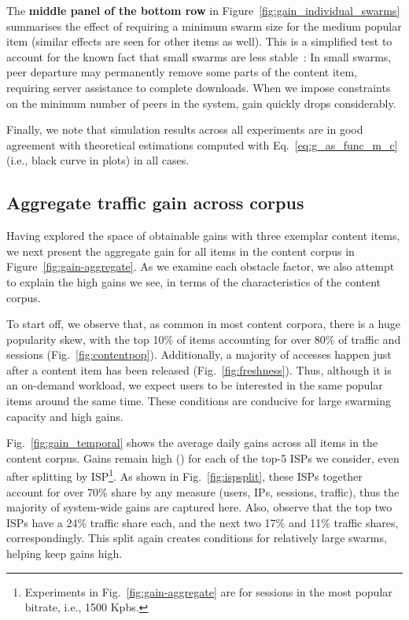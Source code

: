 \documentclass[10pt, conference, letterpaper]{IEEEtran}
\newcommand\fref[1]{Fig.~\ref{#1}}
\begin{document}
The \textbf{middle panel of the bottom row} in Figure~\ref{fig:gain_individual_swarms} summarises the effect of requiring a minimum swarm size  for the medium popular item (similar effects are seen for other items as well). This is a simplified test to account for the known fact that small swarms are less stable~\cite{liu2009peers}: In small swarms, peer departure may permanently remove some parts of the content item, requiring server assistance to complete downloads. When we impose constraints on the minimum number of peers in the system, gain quickly drops considerably. 

Finally, we note that simulation results across all experiments are in good agreement with theoretical estimations computed with Eq.~\ref{eq:g_as_func_m_c} (i.e., black curve in plots) in all cases. 



\subsection{Aggregate traffic gain across  corpus}
\label{sec:aggregate_results}
Having explored the space of obtainable gains with  three exemplar content items, we next present the aggregate gain for all items in the content corpus in Figure~\ref{fig:gain-aggregate}. As we examine each obstacle factor, we also attempt to explain the  high gains we see, in terms of the characteristics of the content corpus. 

To start off, we observe that, as common in most content corpora, there is a huge popularity skew, with the top 10\% of items accounting for over 80\% of traffic and sessions (\fref{fig:contentpop}). Additionally, a majority of accesses happen just after a content item has been released (\fref{fig:freshness}). Thus, although it is an on-demand workload, we expect  users to be interested in the same popular items around the same time. These conditions are conducive for large swarming capacity and high gains.

\fref{fig:gain_temporal} shows the average daily gains across all items in the content corpus. Gains remain high () for each of the top-5 ISPs we consider, even after splitting by ISP\footnote{Experiments in \fref{fig:gain-aggregate} are for sessions in the most popular bitrate, i.e., 1500 Kpbs.}. As shown in \fref{fig:ispsplit}, these ISPs together account for over 70\% share by any measure (users, IPs, sessions, traffic), thus the majority of system-wide gains are captured here. Also, observe that the top two ISPs have a 24\% traffic share each, and the next two 17\% and 11\% traffic shares, correspondingly. This split again creates conditions for relatively large swarms, helping keep gains high. 
\end{document}
